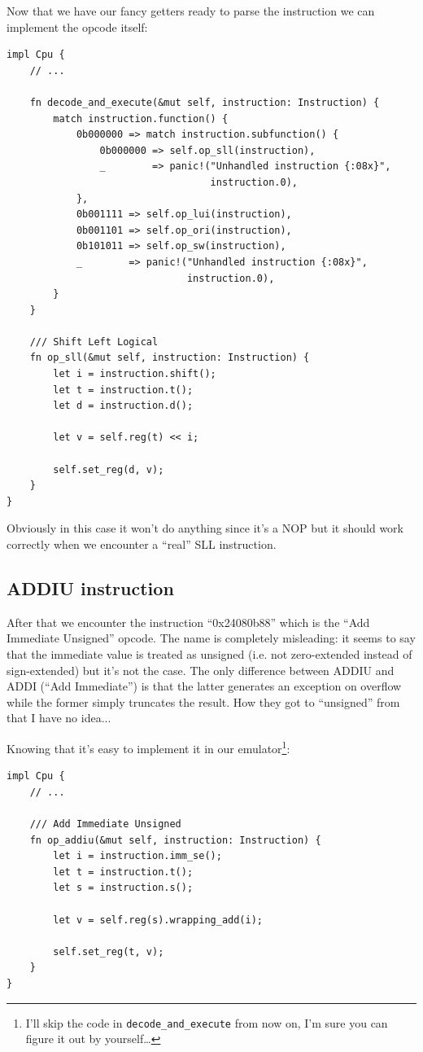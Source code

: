 \documentclass[a4paper]{article}
\newcommand{\code}[1] {\texttt{#1}}
\begin{document}
Now that we have our fancy getters ready to parse the instruction we
can implement the opcode itself:

\begin{lstlisting}
impl Cpu {
    // ...

    fn decode_and_execute(&mut self, instruction: Instruction) {
        match instruction.function() {
            0b000000 => match instruction.subfunction() {
                0b000000 => self.op_sll(instruction),
                _        => panic!("Unhandled instruction {:08x}",
                                   instruction.0),
            },
            0b001111 => self.op_lui(instruction),
            0b001101 => self.op_ori(instruction),
            0b101011 => self.op_sw(instruction),
            _        => panic!("Unhandled instruction {:08x}",
                               instruction.0),
        }
    }

    /// Shift Left Logical
    fn op_sll(&mut self, instruction: Instruction) {
        let i = instruction.shift();
        let t = instruction.t();
        let d = instruction.d();

        let v = self.reg(t) << i;

        self.set_reg(d, v);
    }
}
\end{lstlisting}

Obviously in this case it won't do anything since it's a NOP but it
should work correctly when we encounter a ``real'' SLL instruction.

\subsection{ADDIU instruction}

After that we encounter the instruction ``0x24080b88'' which is the
``Add Immediate Unsigned'' opcode. The name is completely misleading: it
seems to say that the immediate value is treated as unsigned (i.e. not
zero-extended instead of sign-extended) but it's not the case. The
only difference between ADDIU and ADDI (``Add Immediate'') is that
the latter generates an exception on overflow while the former simply
truncates the result. How they got to ``unsigned'' from that I have no
idea...

Knowing that it's easy to implement it in our emulator\footnote{I'll
  skip the code in \code{decode\_and\_execute} from now on, I'm sure
  you can figure it out by yourself\dots{}}:

\begin{lstlisting}
impl Cpu {
    // ...

    /// Add Immediate Unsigned
    fn op_addiu(&mut self, instruction: Instruction) {
        let i = instruction.imm_se();
        let t = instruction.t();
        let s = instruction.s();

        let v = self.reg(s).wrapping_add(i);

        self.set_reg(t, v);
    }
}
\end{lstlisting}
\end{document}
